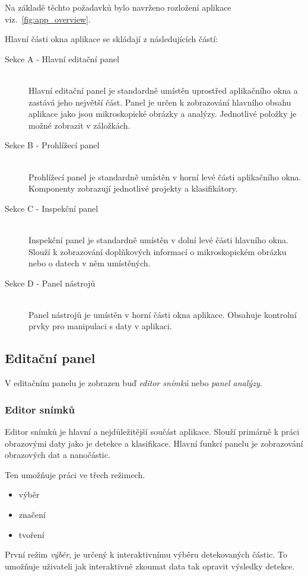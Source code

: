 \documentclass[11pt,twoside,a4paper,table]{book}
\begin{document}
Na základě těchto požadavků bylo navrženo rozložení aplikace viz.~\ref{fig:app_overview}. 

Hlavní části okna aplikace se skládají z následujících částí:
\begin{description}
	\item[Sekce A - Hlavní editační panel] \hfill \\
	Hlavní editační panel je standardně umístěn uprostřed aplikačního okna a zastává jeho největší část. Panel je určen k zobrazování hlavního obsahu aplikace jako jsou mikroskopické obrázky a analýzy. Jednotlivé položky je možné zobrazit v záložkách. 
	\item[Sekce B - Prohlížecí panel] \hfill \\
	Prohlížecí panel je standardně umístěn v horní levé části aplikačního okna. Komponenty zobrazují jednotlivé projekty a klasifikátory.
	\item[Sekce C - Inspekční panel] \hfill \\
	Inspekční panel je standardně umístěn v dolní levé části hlavního okna. Slouží k zobrazování doplňkových informací o mikroskopickém obrázku nebo o datech v něm umístěných.
	\item[Sekce D - Panel nástrojů] \hfill \\
	Panel nástrojů je umístěn v horní části okna aplikace. Obsahuje kontrolní prvky pro manipulaci s daty v aplikaci.
\end{description}
\subsection{Editační panel}
V editačním panelu je zobrazen buď \textit{editor snímků} nebo \textit{panel analýzy}. 

\subsubsection{Editor snímků}
Editor snímků je hlavní a nejdůležitější součást aplikace. Slouží primárně k práci obrazovými daty jako je detekce a klasifikace. Hlavní funkcí panelu je zobrazování obrazových dat a nanočástic.

Ten umožňuje práci ve třech režimech.
\begin{itemize}
\item výběr
\item značení
\item tvoření
\end{itemize}

První režim \textit{výběr}, je určený k interaktivnímu výběru detekovaných částic. To umožňuje uživateli jak interaktivně zkoumat data tak opravit výsledky detekce.
\end{document}

